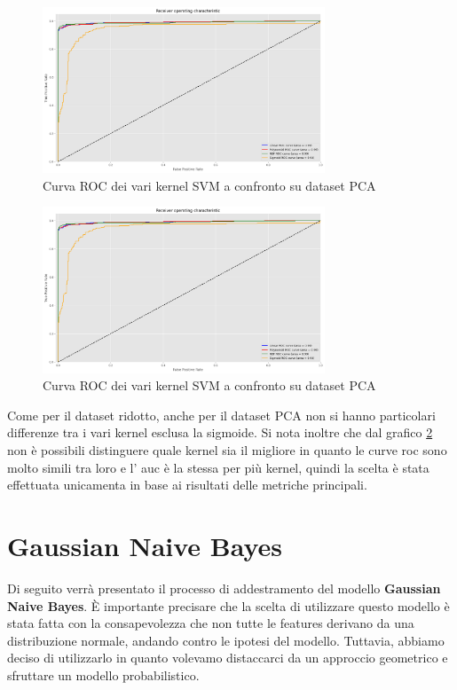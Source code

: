 \begin{figure}[!ht]
    \centering
    \includegraphics[width=0.75\textwidth]{img/svm/SVM_roc_pca.png}
    \caption{Curva ROC dei vari kernel SVM a confronto su dataset PCA}
    \label{fig:roc_SVM_PCA}
\end{figure}

    \begin{figure}[!ht]
        \centering
        \includegraphics[width=0.75\textwidth]{img/svm/SVM_roc_pca.png}
        \caption{Curva ROC dei vari kernel SVM a confronto su dataset PCA}
        \label{fig:roc_SVM_PCA}
    \end{figure}

    Come per il dataset ridotto, anche per il dataset PCA non si hanno particolari
    differenze tra i vari kernel esclusa la sigmoide. Si nota inoltre che dal 
    grafico \ref{fig:roc_SVM_PCA} non è possibili distinguere quale kernel sia
    il migliore in quanto le curve roc sono molto simili tra loro e l' auc è la
    stessa per più kernel, quindi la scelta è stata effettuata unicamenta in base
    ai risultati delle metriche principali. 

\newpage

\section{Gaussian Naive Bayes}
Di seguito verrà presentato il processo di addestramento del modello
\textbf{Gaussian Naive Bayes}. È importante precisare che la scelta di utilizzare
questo modello è stata fatta con la consapevolezza che non tutte le features
derivano da una distribuzione normale, andando contro le ipotesi del modello.
Tuttavia, abbiamo deciso di utilizzarlo in quanto volevamo distaccarci da un
approccio geometrico e sfruttare un modello probabilistico.
